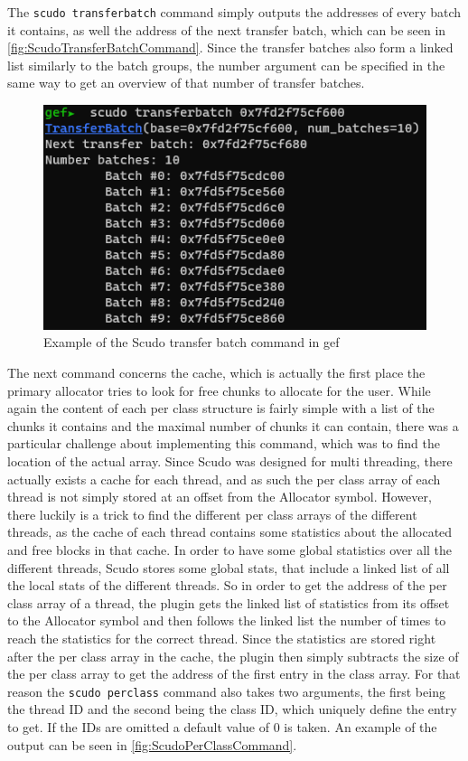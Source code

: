\documentclass[a4paper,11pt,oneside]{report}
\begin{document}
The \verb|scudo transferbatch| command simply outputs the addresses of every batch
it contains, as well the address of the next transfer batch, which can be seen
in \autoref{fig:ScudoTransferBatchCommand}. Since the transfer batches also
form a linked list similarly to the batch groups, the number argument can be
specified in the same way to get an overview of that number of transfer batches.

\begin{figure}[h!]
  \centering
  \includegraphics{figures/ScudoTransferBatchCommand.png}
  \caption{Example of the Scudo transfer batch command in gef}
  \label{fig:ScudoTransferBatchCommand}
\end{figure}

The next command concerns the cache, which is actually the first place the
primary allocator tries to look for free chunks to allocate for the user.
While again the content of each per class structure is fairly simple with a
list of the chunks it contains and the maximal number of chunks it can contain,
there was a particular challenge about implementing this command, which was to
find the location of the actual array. Since Scudo was designed for multi
threading, there actually exists a cache for each thread, and as such the per
class array of each thread is not simply stored at an offset from the Allocator
symbol. However, there luckily is a trick to find the different per class arrays
of the different threads, as the cache of each thread contains some statistics
about the allocated and free blocks in that cache. In order to have some global
statistics over all the different threads, Scudo stores some global stats, that
include a linked list of all the local stats of the different threads. So in
order to get the address of the per class array of a thread, the plugin gets
the linked list of statistics from its offset to the Allocator symbol and then
follows the linked list the number of times to reach the statistics for the
correct thread. Since the statistics are stored right after the per class array
in the cache, the plugin then simply subtracts the size of the per class array
to get the address of the first entry in the class array.
For that reason the \verb|scudo perclass| command also takes two arguments, the first
being the thread ID and the second being the class ID, which uniquely define
the entry to get. If the IDs are omitted a default value of 0 is taken. An
example of the output can be seen in \autoref{fig:ScudoPerClassCommand}.
\end{document}
